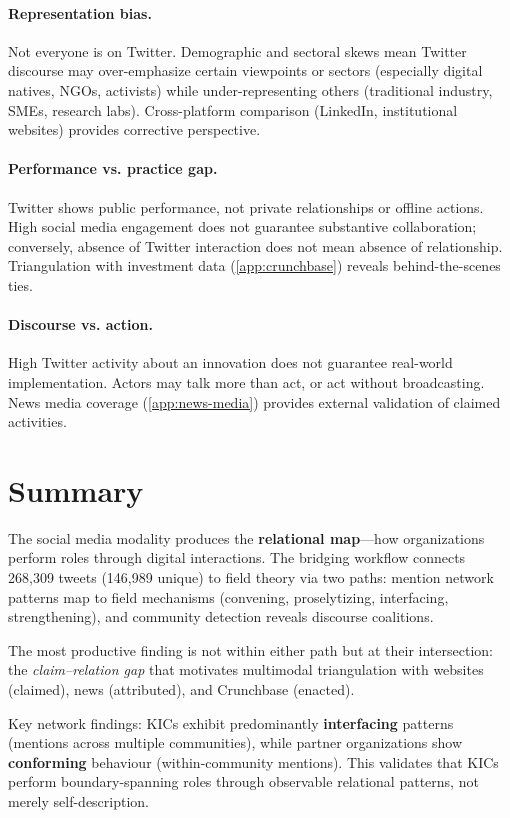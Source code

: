 \documentclass[../main.tex]{subfiles}
\begin{document}
\paragraph{Representation bias.}
Not everyone is on Twitter. Demographic and sectoral skews mean Twitter
discourse may over-emphasize certain viewpoints or sectors (especially
digital natives, NGOs, activists) while under-representing others
(traditional industry, SMEs, research labs).
Cross-platform comparison (LinkedIn, institutional websites) provides
corrective perspective.

\paragraph{Performance vs. practice gap.}
Twitter shows public performance, not private relationships or offline
actions. High social media engagement does not guarantee substantive
collaboration; conversely, absence of Twitter interaction does not mean
absence of relationship.
Triangulation with investment data (\cref{app:crunchbase}) reveals
behind-the-scenes ties.

\paragraph{Discourse vs. action.}
High Twitter activity about an innovation does not guarantee real-world
implementation. Actors may talk more than act, or act without broadcasting.
News media coverage (\cref{app:news-media}) provides external validation
of claimed activities.


\section{Summary}

\begin{summarybox}
The social media modality produces the \textbf{relational map}---how
organizations perform roles through digital interactions.
The bridging workflow connects 268,309 tweets (146,989 unique) to
field theory via two paths: mention network patterns map to field
mechanisms (convening, proselytizing, interfacing, strengthening),
and community detection reveals discourse coalitions.

The most productive finding is not within either path but at their
intersection: the \emph{claim--relation gap} that motivates multimodal
triangulation with websites (claimed), news (attributed), and Crunchbase (enacted).

Key network findings: KICs exhibit predominantly \textbf{interfacing} patterns
(mentions across multiple communities), while partner organizations show
\textbf{conforming} behaviour (within-community mentions).
This validates that KICs perform boundary-spanning roles through observable
relational patterns, not merely self-description.
\end{summarybox}

\clearpage
{}
\end{document}
